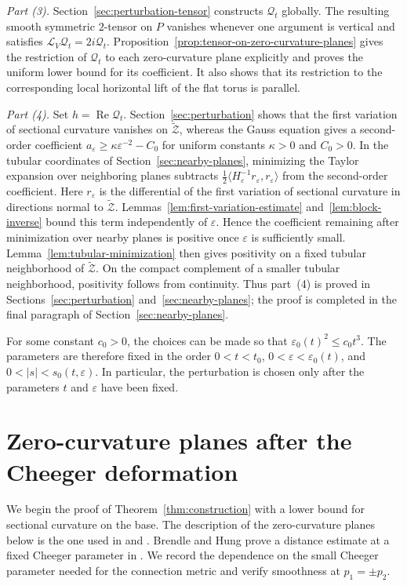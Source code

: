 \documentclass[11pt]{article}
\theoremstyle{definition}
\theoremstyle{remark}
\newcommand{\tZ}{\widetilde{\mathcal Z}}
\newcommand{\Lie}{\mathcal L}
\newcommand{\eps}{\varepsilon}
\begin{document}
\noindent\emph{Part (3).}
Section~\ref{sec:perturbation-tensor} constructs $\mathcal Q_t$ globally.
The resulting smooth symmetric $2$-tensor on $P$ vanishes whenever one
argument is vertical and satisfies $\Lie_V\mathcal Q_t=2i\mathcal Q_t$.
Proposition~\ref{prop:tensor-on-zero-curvature-planes} gives the restriction
of $\mathcal Q_t$ to each zero-curvature plane explicitly and proves the
uniform lower bound for its coefficient.  It also shows that its restriction
to the corresponding local horizontal lift of the flat torus is parallel.

\noindent\emph{Part (4).}
Set $h=\operatorname{Re}\mathcal Q_t$.  Section~\ref{sec:perturbation}
shows that the first variation of sectional curvature vanishes on $\tZ$,
whereas the Gauss equation gives a second-order coefficient
$a_\eps\geq\kappa\eps^{-2}-C_0$ for uniform constants $\kappa>0$ and
$C_0>0$.  In the tubular coordinates of
Section~\ref{sec:nearby-planes}, minimizing the Taylor expansion over
neighboring planes subtracts
$\tfrac12\langle H_\eps^{-1}r_\eps,r_\eps\rangle$ from the second-order coefficient.
Here $r_\eps$ is the differential of the first variation of sectional
curvature in directions normal to $\tZ$.
Lemmas~\ref{lem:first-variation-estimate} and~\ref{lem:block-inverse} bound this
term independently of $\eps$.  Hence the coefficient remaining after
minimization over nearby planes is positive once $\eps$ is sufficiently small.
Lemma~\ref{lem:tubular-minimization} then gives positivity on a fixed tubular
neighborhood of $\tZ$.  On the compact complement of a smaller tubular
neighborhood, positivity follows from continuity.
Thus part~(4) is proved in Sections~\ref{sec:perturbation}
and~\ref{sec:nearby-planes}; the proof is completed in the final paragraph of
Section~\ref{sec:nearby-planes}.

For some constant $c_0>0$, the choices can be made so that
$\eps_0(t)^2\leq c_0t^3$.  The
parameters are therefore fixed in the order
$0<t<t_0$, $0<\eps<\eps_0(t)$, and
$0<|s|<s_0(t,\eps)$.  In particular, the perturbation is chosen only after
the parameters $t$ and $\eps$ have been fixed.

\section{Zero-curvature planes after the Cheeger deformation}                     \label{sec:cheeger}

We begin the proof of Theorem~\ref{thm:construction} with a lower bound for
sectional curvature on the base.  The description of the zero-curvature planes below is
the one used in
\cite[Proposition~2.3]{Bettiol2014} and
\cite[Appendix~B]{BrendleHung2026}.  Brendle and Hung prove a distance
estimate at a fixed Cheeger parameter in
\cite[Proposition~B.1 and Corollary~B.2]{BrendleHung2026}.  We record the
dependence on the small Cheeger parameter needed for the connection metric and
verify smoothness at $p_1=\pm p_2$.
\end{document}
